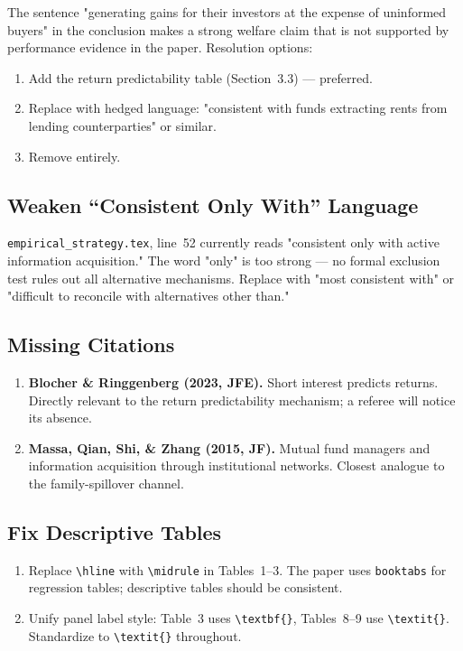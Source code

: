 \documentclass[11pt, a4paper]{article}
\begin{document}
The sentence "generating gains for their investors at the expense of uninformed buyers" in the
conclusion makes a strong welfare claim that is not supported by performance evidence in the
paper. Resolution options:

\begin{enumerate}[leftmargin=2em, label=(\alph*)]
  \item Add the return predictability table (Section~3.3) — preferred.
  \item Replace with hedged language: "consistent with funds extracting rents from lending
        counterparties" or similar.
  \item Remove entirely.
\end{enumerate}

\subsection{Weaken ``Consistent Only With'' Language}

\texttt{empirical\_strategy.tex}, line~52 currently reads "consistent only with active
information acquisition." The word "only" is too strong — no formal exclusion test rules
out all alternative mechanisms. Replace with "most consistent with" or "difficult to reconcile
with alternatives other than."

\subsection{Missing Citations}

\begin{enumerate}[leftmargin=2em]
  \item \textbf{Blocher \& Ringgenberg (2023, JFE).} Short interest predicts returns. Directly
        relevant to the return predictability mechanism; a referee will notice its absence.
  \item \textbf{Massa, Qian, Shi, \& Zhang (2015, JF).} Mutual fund managers and information
        acquisition through institutional networks. Closest analogue to the family-spillover
        channel.
\end{enumerate}

\subsection{Fix Descriptive Tables}

\begin{enumerate}[leftmargin=2em]
  \item Replace \texttt{\textbackslash hline} with \texttt{\textbackslash midrule} in Tables~1--3.
        The paper uses \texttt{booktabs} for regression tables; descriptive tables should be
        consistent.
  \item Unify panel label style: Table~3 uses \texttt{\textbackslash textbf\{\}}, Tables~8--9
        use \texttt{\textbackslash textit\{\}}. Standardize to \texttt{\textbackslash textit\{\}}
        throughout.
\end{enumerate}
\end{document}
